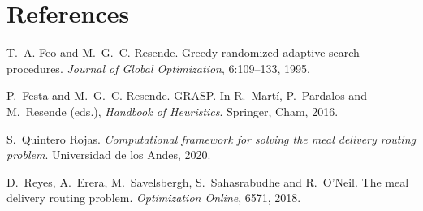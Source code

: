 \documentclass[11pt]{article}
\begin{document}
\section*{References}
\begin{enumerate}[label={[\arabic*]}, leftmargin=*]
  \item T.~A. Feo and M.~G.~C. Resende. Greedy randomized adaptive search
        procedures. \emph{Journal of Global Optimization}, 6:109--133, 1995.
  \item P.~Festa and M.~G.~C. Resende. GRASP. In R.~Mart\'i, P.~Pardalos and
        M.~Resende (eds.), \emph{Handbook of Heuristics}. Springer, Cham, 2016.
  \item S.~Quintero Rojas. \emph{Computational framework for solving the meal
        delivery routing problem}. Universidad de los Andes, 2020.
  \item D.~Reyes, A.~Erera, M.~Savelsbergh, S.~Sahasrabudhe and R.~O'Neil.
        The meal delivery routing problem. \emph{Optimization Online}, 6571,
        2018.
\end{enumerate}
\end{document}
